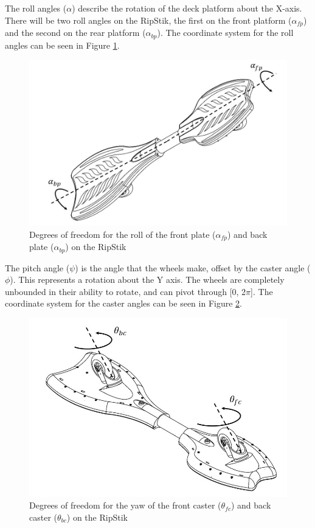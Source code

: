 \par
The roll angles ($\alpha$) describe the rotation of the deck platform about the X-axis. There will be two roll angles on the RipStik, the first on the front platform ($\alpha_{fp}$) and the second on the rear platform ($\alpha_{bp}$). The coordinate system for the roll angles can be seen in Figure \ref{fig:RipStikroll}.

\begin{figure}[!htb]
	\centering
	\includegraphics[width=\linewidth]{DOFpart2.jpg}
	\caption{Degrees of freedom for the roll of the front plate ($\alpha_{fp}$) and back plate ($\alpha_{bp}$) on the RipStik}\label{fig:RipStikroll}
	\endminipage
\end{figure}


\par
The pitch angle ($\psi$) is the angle that the wheels make, offset by the caster angle ($\phi$). This represents a rotation about the Y axis. The wheels are completely unbounded in their ability to rotate, and can pivot through [0, 2$\pi$]. The coordinate system for the caster angles can be seen in Figure \ref{fig:RipStikyaw}.

\begin{figure}[!htb]
	\centering
	\includegraphics[width=\linewidth]{DOFpart3.jpg}
	\caption{Degrees of freedom for the yaw of the front caster ($\theta_{fc}$) and back caster ($\theta_{bc}$) on the RipStik }\label{fig:RipStikyaw}
	\endminipage
\end{figure}

